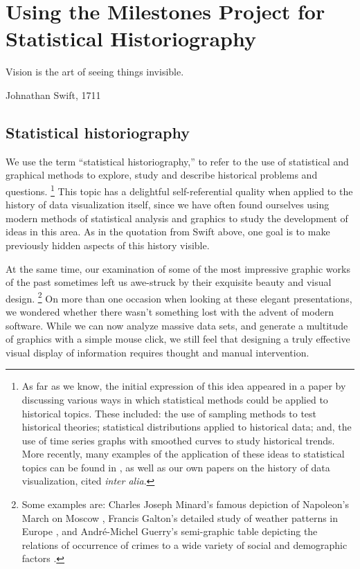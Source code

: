 \section{Using the Milestones Project for Statistical Historiography}\label{sec:historiography}
\epigraph{Vision is the art of seeing things invisible.}{Johnathan Swift, 1711}

\subsection{Statistical historiography}\label{sec:stathist}
We use the term ``statistical historiography,'' to refer to the use of statistical and graphical methods to explore, study and describe historical problems and questions.%
\footnote{As far as we know, the initial expression of this idea appeared in a paper by \citet{Rubin:1943} discussing various ways in which statistical methods could be applied to historical topics.  These included: the use of sampling methods to test historical theories; statistical distributions applied to historical data; and, the use of time series graphs with smoothed curves to study historical trends. More recently, many examples of the application of these ideas to statistical topics can be found in \citet{Stigler:1986,Stigler:1999}, as well as our own papers on the history of data visualization, cited \emph{inter alia}.}
This topic has a delightful self-referential quality when applied to the history of data visualization itself, since we have often found ourselves using modern methods of statistical analysis and graphics to study the development of ideas in this area. As in the quotation from Swift above, one goal is to make previously hidden aspects of this history visible.

At the same time, our examination of some of the most impressive graphic works of the past sometimes left us awe-struck by their exquisite beauty and visual design.%
\footnote{Some examples are: Charles Joseph Minard's famous depiction of Napoleon's March on Moscow \citep{Friendly:02:Minard}, Francis Galton's detailed study of weather patterns in Europe \citep[see:][]{Friendly:2008:golden}, and Andr{\'e}-Michel Guerry's \citep[Plate 17]{Guerry:1864} semi-graphic table depicting the relations of occurrence of crimes to a wide variety of social and demographic factors \citep[see:][]{Friendly:2007:guerry}.}
On more than one occasion when looking at these elegant presentations, we wondered whether there wasn't something lost with the advent of modern software. While we can now analyze massive data sets, and generate a multitude of graphics with a simple mouse click, we still feel that designing a truly effective visual display of information requires thought and manual intervention.


